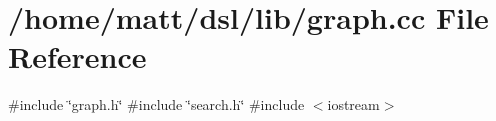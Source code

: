 \section{/home/matt/dsl/lib/graph.cc \-File \-Reference}
\label{graph_8cc}
{\ttfamily \#include \char`\"{}graph.\-h\char`\"{}}\*
{\ttfamily \#include \char`\"{}search.\-h\char`\"{}}\*
{\ttfamily \#include $<$iostream$>$}\*
